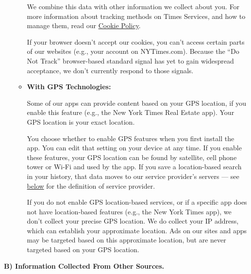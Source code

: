 \begin{enumerate}
\begin{itemize}
    We combine this data with other information we collect about you.
    For more information about tracking methods on Times Services, and
    how to manage them, read our
    \href{https://www.nytimes3xbfgragh.onion/subscription/dg-cookie-policy/cookie-policy.html}{Cookie
    Policy}.

    If your browser doesn't accept our cookies, you can't access certain
    parts of our websites (e.g., your account on NYTimes.com). Because
    the ``Do Not Track'' browser-based standard signal has yet to gain
    widespread acceptance, we don't currently respond to those signals.
  \item
    \textbf{With GPS Technologies:}

    Some of our apps can provide content based on your GPS location, if
    you enable this feature (e.g., the New York Times Real Estate app).
    Your GPS location is your exact location.

    You choose whether to enable GPS features when you first install the
    app. You can edit that setting on your device at any time. If you
    enable these features, your GPS location can be found by satellite,
    cell phone tower or Wi-Fi and used by the app. If you save a
    location-based search in your history, that data moves to our
    service provider's servers --- see
    \protect\hyperlink{anchor-question2-sectionE}{below} for the
    definition of service provider.

    If you do not enable GPS location-based services, or if a specific
    app does not have location-based features (e.g., the New York Times
    app), we don't collect your precise GPS location. We do collect your
    IP address, which can establish your approximate location. Ads on
    our sites and apps may be targeted based on this approximate
    location, but are never targeted based on your GPS location.
  \end{itemize}
\end{enumerate}

\textbf{B) Information Collected From Other Sources.}

